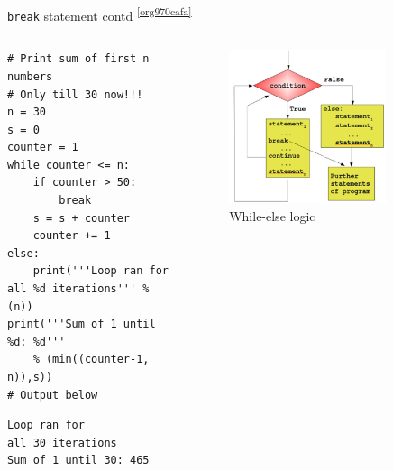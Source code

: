 \documentclass[presentation]{beamer}
\begin{document}
\begin{frame}[label={sec:org5e4b1ae},fragile]{\texttt{break} statement contd \textsuperscript{\cref{org970cafa}}}
 \begin{columns}
\begin{column}{0.48\columnwidth}
\scriptsize
\begin{verbatim}
# Print sum of first n numbers
# Only till 30 now!!!
n = 30
s = 0
counter = 1
while counter <= n:
    if counter > 50:
        break
    s = s + counter
    counter += 1
else:
    print('''Loop ran for
all %d iterations''' % (n))
print('''Sum of 1 until %d: %d'''
    % (min((counter-1, n)),s))
# Output below
\end{verbatim}

\begin{verbatim}
Loop ran for
all 30 iterations
Sum of 1 until 30: 465
\end{verbatim}
\end{column}

\begin{column}{0.45\columnwidth}
\footnotesize
\begin{figure}[htbp]
\centering
\includegraphics[width=0.8\textwidth]{images/while_loop_with_else_break.png}
\caption{While-else logic}
\end{figure}
\end{column}
\end{columns}
\end{frame}
\end{document}
